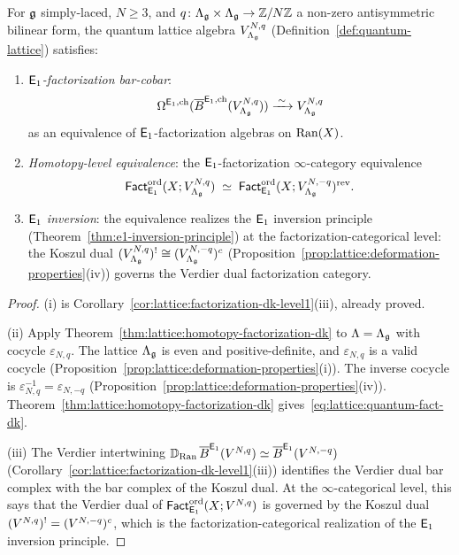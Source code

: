 \begin{theorem}
\label{thm:lattice:quantum-factorization-dk}
For $\mathfrak{g}$ simply-laced, $N \geq 3$, and $q \colon \Lambda_{\mathfrak{g}}
\times \Lambda_{\mathfrak{g}} \to \mathbb{Z}/N\mathbb{Z}$ a non-zero antisymmetric bilinear
form, the quantum lattice algebra
$V_{\Lambda_{\mathfrak{g}}}^{N,q}$
\textup{(}Definition~\textup{\ref{def:quantum-lattice})} satisfies:
\begin{enumerate}[label=(\roman*)]
\item \emph{$\mathsf{E}_1$-factorization bar-cobar}:
  \[
  \Omega^{\mathsf{E}_1,\mathrm{ch}}(
    \overline{B}^{\mathsf{E}_1,\mathrm{ch}}(V_{\Lambda_{\mathfrak{g}}}^{N,q}))
  \xrightarrow{\;\sim\;}
  V_{\Lambda_{\mathfrak{g}}}^{N,q}
  \]
  as an equivalence of $\mathsf{E}_1$-factorization algebras on $\operatorname{Ran}(X)$.
\item \emph{Homotopy-level equivalence}: the
  $\mathsf{E}_1$-factorization $\infty$-category equivalence
  \begin{equation}\label{eq:lattice:quantum-fact-dk}
  \mathsf{Fact}_{\mathsf{E}_1}^{\mathrm{ord}}(X; V_{\Lambda_{\mathfrak{g}}}^{N,q})
  \;\simeq\;
  \mathsf{Fact}_{\mathsf{E}_1}^{\mathrm{ord}}(X; V_{\Lambda_{\mathfrak{g}}}^{N,-q})^{\mathrm{rev}}.
  \end{equation}
\item \emph{$\mathsf{E}_1$ inversion}: the equivalence realizes the
  $\mathsf{E}_1$ inversion principle
  \textup{(}Theorem~\textup{\ref{thm:e1-inversion-principle})}
  at the factorization-categorical level: the Koszul dual
  $(V_{\Lambda_{\mathfrak{g}}}^{N,q})^!
  \cong (V_{\Lambda_{\mathfrak{g}}}^{N,-q})^c$
  \textup{(}Proposition~\textup{\ref{prop:lattice:deformation-properties}(iv))}
  governs the Verdier dual factorization category.
\end{enumerate}
\end{theorem}

\begin{proof}
(i) is Corollary~\ref{cor:lattice:factorization-dk-level1}(iii),
already proved.

(ii) Apply
Theorem~\ref{thm:lattice:homotopy-factorization-dk} to $\Lambda =
\Lambda_{\mathfrak{g}}$ with cocycle $\varepsilon_{N,q}$.  The lattice
$\Lambda_{\mathfrak{g}}$ is even and positive-definite, and
$\varepsilon_{N,q}$ is a valid cocycle
(Proposition~\ref{prop:lattice:deformation-properties}(i)).  The
inverse cocycle is $\varepsilon_{N,q}^{-1} = \varepsilon_{N,-q}$
(Proposition~\ref{prop:lattice:deformation-properties}(iv)).
Theorem~\ref{thm:lattice:homotopy-factorization-dk}
gives~\eqref{eq:lattice:quantum-fact-dk}.

(iii) The Verdier intertwining
$\mathbb{D}_{\operatorname{Ran}}\, \overline{B}^{\mathsf{E}_1}(V^{N,q})
\simeq \overline{B}^{\mathsf{E}_1}(V^{N,-q})$
(Corollary~\ref{cor:lattice:factorization-dk-level1}(iii))
identifies the Verdier dual bar complex with the bar complex of
the Koszul dual.  At the $\infty$-categorical level, this says
that the Verdier dual of
$\mathsf{Fact}_{\mathsf{E}_1}^{\mathrm{ord}}(X; V^{N,q})$ is governed by the Koszul dual
$(V^{N,q})^! = (V^{N,-q})^c$, which is the
factorization-categorical realization of the $\mathsf{E}_1$ inversion
principle.
\end{proof}


